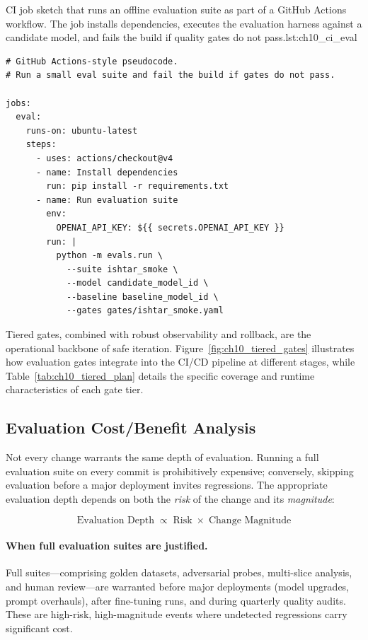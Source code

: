 \begin{codebox}{CI job sketch that runs an offline evaluation suite as part of a GitHub Actions workflow. The job installs dependencies, executes the evaluation harness against a candidate model, and fails the build if quality gates do not pass.}{lst:ch10_ci_eval}
\begin{verbatim}
# GitHub Actions-style pseudocode.
# Run a small eval suite and fail the build if gates do not pass.

jobs:
  eval:
    runs-on: ubuntu-latest
    steps:
      - uses: actions/checkout@v4
      - name: Install dependencies
        run: pip install -r requirements.txt
      - name: Run evaluation suite
        env:
          OPENAI_API_KEY: ${{ secrets.OPENAI_API_KEY }}
        run: |
          python -m evals.run \
            --suite ishtar_smoke \
            --model candidate_model_id \
            --baseline baseline_model_id \
            --gates gates/ishtar_smoke.yaml
\end{verbatim}
\end{codebox}

Tiered gates, combined with robust observability and rollback, are the operational backbone of safe iteration. Figure~\ref{fig:ch10_tiered_gates} illustrates how evaluation gates integrate into the CI/CD pipeline at different stages, while Table~\ref{tab:ch10_tiered_plan} details the specific coverage and runtime characteristics of each gate tier.

\subsection{Evaluation Cost/Benefit Analysis}
\label{sec:ch10-eval-cost-benefit}

Not every change warrants the same depth of evaluation. Running a full evaluation suite on every commit is prohibitively expensive; conversely, skipping evaluation before a major deployment invites regressions. The appropriate evaluation depth depends on both the \emph{risk} of the change and its \emph{magnitude}:

\begin{equation}
\text{Evaluation Depth} \;\propto\; \text{Risk} \;\times\; \text{Change Magnitude}
\label{eq:eval-depth}
\end{equation}

\paragraph{When full evaluation suites are justified.}
Full suites---comprising golden datasets, adversarial probes, multi-slice analysis, and human review---are warranted before major deployments (model upgrades, prompt overhauls), after fine-tuning runs, and during quarterly quality audits. These are high-risk, high-magnitude events where undetected regressions carry significant cost.

